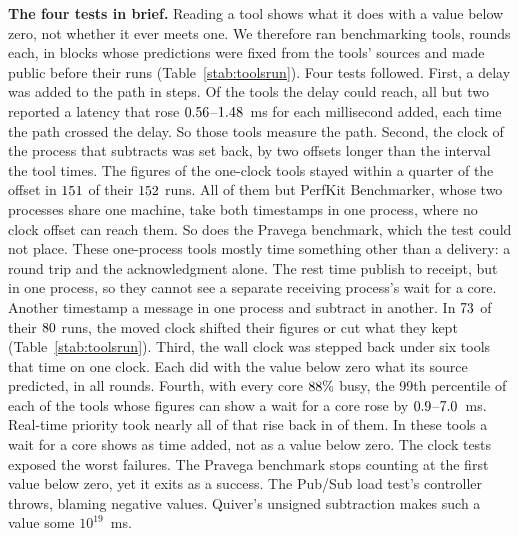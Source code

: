 \documentclass[10pt,journal,onecolumn]{IEEEtran}
\begin{document}
\textbf{The four tests in brief.} Reading a tool shows what it does with a value below zero, not whether it ever meets one. We
therefore ran \toolsRunWord{} benchmarking tools, \toolsRoundsWord{} rounds each, in blocks whose
predictions were fixed from the tools' sources and made public before their runs
(Table~\ref{stab:toolsrun}). Four tests followed. First, a delay was added to the
path in steps. Of the tools the delay could reach, all but two
reported a latency that rose $0.56$--$1.48$~ms for each millisecond added, each
time the path crossed the delay. So those tools measure the path. Second, the clock of the process
that subtracts was set back, by two
offsets longer than the interval the tool times. The figures of the \toolsOneClockWord{} one-clock tools stayed
within a quarter of the offset in $151$ of their $152$ runs. All of
them but PerfKit Benchmarker, whose two processes
share one machine, take both timestamps in one process, where no clock offset can reach them.
So does the Pravega benchmark, which the test could not place. These \toolsOneProcessWord{}
one-process tools mostly time
something other than a delivery: \toolsOneProcessTripWord{} a round trip and
\toolsOneProcessAckWord{} the acknowledgment alone. The rest time publish to receipt, but in one
process, so they cannot see a separate receiving process's wait for a core. Another
\toolsTwoClockWord{} timestamp a message in one process and subtract in another. In
$73$ of their $80$ runs, the moved clock shifted their figures or cut
what they kept (Table~\ref{stab:toolsrun}). Third, the wall clock was stepped back under six tools that time on
one clock. Each did with the value below zero what its source predicted, in all \sOneRoundsWord{}
rounds. Fourth, with every core $88\%$
busy, the 99th percentile of each of the \toolsTailToolsWord{} tools whose figures can show a wait
for a core rose by $0.9$--$7.0$~ms. Real-time priority took nearly
all of that rise back in \toolsTailBackWord{} of them. In these tools a wait for a core shows as
time added, not as a value below zero. The clock tests exposed the worst failures. The Pravega
benchmark stops counting at the first value below zero, yet it exits as a success. The Pub/Sub load
test's controller throws, blaming negative values. Quiver's unsigned subtraction
makes such a value some $10^{19}$~ms.
\end{document}
